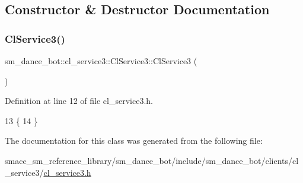 \subsection{Constructor \& Destructor Documentation}
\mbox{\label{classsm__dance__bot_1_1cl__service3_1_1ClService3_ab03b879865a37e88ceb753e20dd43311}} 
\subsubsection{\texorpdfstring{Cl\+Service3()}{ClService3()}}
{\footnotesize\ttfamily sm\+\_\+dance\+\_\+bot\+::cl\+\_\+service3\+::\+Cl\+Service3\+::\+Cl\+Service3 (\begin{DoxyParamCaption}{ }\end{DoxyParamCaption})\hspace{0.3cm}{\ttfamily [inline]}}



Definition at line 12 of file cl\+\_\+service3.\+h.


\begin{DoxyCode}
13   \{
14   \}
\end{DoxyCode}


The documentation for this class was generated from the following file\+:\begin{DoxyCompactItemize}
\item 
smacc\+\_\+sm\+\_\+reference\+\_\+library/sm\+\_\+dance\+\_\+bot/include/sm\+\_\+dance\+\_\+bot/clients/cl\+\_\+service3/\hyperlink{include_2sm__dance__bot_2clients_2cl__service3_2cl__service3_8h}{cl\+\_\+service3.\+h}\end{DoxyCompactItemize}
